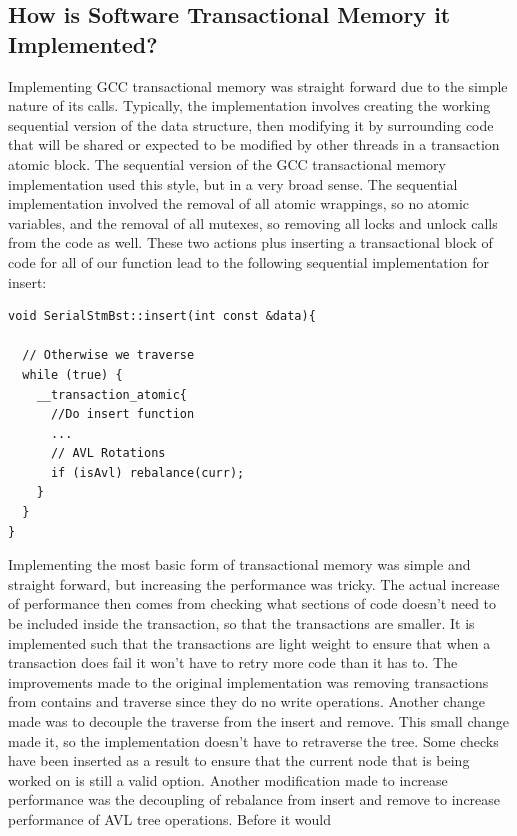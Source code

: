 \documentclass[conference]{IEEEtran}
\begin{document}
\subsection{How is Software Transactional Memory it Implemented?}
Implementing GCC transactional memory was straight forward due to the simple nature of its calls. Typically, the implementation involves creating the working sequential version of the data structure, then modifying it by surrounding code that will be shared or expected to be modified by other threads in a transaction atomic block. The sequential version of the GCC transactional memory implementation used this style, but in a very broad sense. The sequential implementation involved the removal of all atomic wrappings, so no atomic variables, and the removal of all mutexes, so removing all locks and unlock calls from the code as well. These two actions plus inserting a transactional block of code for all of our function lead to the following sequential implementation for insert:
\begin{lstlisting}
void SerialStmBst::insert(int const &data){

  // Otherwise we traverse
  while (true) {
    __transaction_atomic{
      //Do insert function
      ...
      // AVL Rotations
      if (isAvl) rebalance(curr);
    }
  }
}  
\end{lstlisting}
Implementing the most basic form of transactional memory was simple and straight forward, but increasing the performance was tricky. The actual increase of performance then comes from checking what sections of code doesn't need to be included inside the transaction, so that the transactions are smaller. It is implemented such that the transactions are light weight to ensure that when a transaction does fail it won't have to retry more code than it has to. The improvements made to the original implementation was removing transactions from contains and traverse since they do no write operations. Another change made was to decouple the traverse from the insert and remove. This small change made it, so the implementation doesn't have to retraverse the tree. Some checks have been inserted as a result to ensure that the current node that is being worked on is still a valid option. Another modification made to increase performance was the decoupling of rebalance from insert and remove to increase performance of AVL tree operations. Before it would
\end{document}

